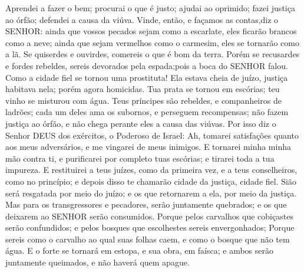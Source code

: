 {Aprendei a fazer o bem; procurai o que é justo; ajudai ao oprimido; fazei justiça ao órfão; defendei a causa da viúva.
Vinde, então, e façamos as contas,diz o SENHOR: ainda que vossos pecados sejam como a escarlate, eles ficarão brancos como a neve; ainda que sejam vermelhos como o carmesim, eles se tornarão como a lã.
Se quiserdes e ouvirdes, comereis o que é bom da terra.
Porém se recusardes e fordes rebeldes, sereis devorados pela espada;pois
{} a boca do SENHOR falou.
Como a cidade fiel se tornou uma prostituta! Ela estava cheia de juízo, justiça habitava nela; porém agora homicidas.
Tua prata se tornou em escórias; teu vinho se misturou com água.
Teus príncipes são rebeldes, e companheiros de ladrões; cada um deles ama os subornos, e perseguem recompensas; não fazem justiça ao órfão, e não chega perante eles a causa das viúvas.
Por isso diz o Senhor DEUS dos exércitos, o Poderoso de Israel: Ah, tomarei satisfações quanto aos meus adversários, e me vingarei de meus inimigos.
E tornarei minha minha mão contra ti, e purificarei por completo tuas escórias; e tirarei toda a tua impureza.
E restituirei a teus juízes, como da primeira vez, e a teus conselheiros, como no princípio; e depois disso te chamarão cidade da justiça, cidade fiel.
Sião será resgatada por meio do juízo; e os que retornarem a ela, por meio da justiça.
Mas para os transgressores e pecadores, serão juntamente quebrados; e os que deixarem ao SENHOR serão consumidos.
Porque pelos carvalhos que cobiçastes serão confundidos; e pelos bosques que escolhestes sereis envergonhados;
Porque sereis como o carvalho ao qual suas folhas caem, e como o bosque que não tem água.
E o forte se tornará em estopa, e sua obra, em faísca; e ambos serão juntamente queimados, e não haverá quem
{} apague.

}
